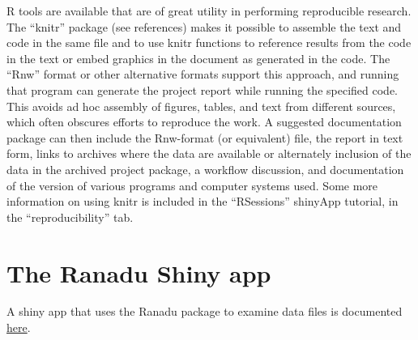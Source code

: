 \documentclass[12pt,english]{report}\usepackage[]{graphicx}\usepackage[]{color}
\begin{document}
R tools are available that are of great utility in performing reproducible
research. The ``knitr'' package (see references) makes it possible
to assemble the text and code in the same file and to use knitr functions
to reference results from the code in the text or embed graphics in
the document as generated in the code. The ``Rnw'' format or other
alternative formats support this approach, and running that program
can generate the project report while running the specified code.
This avoids ad hoc assembly of figures, tables, and text from different
sources, which often obscures efforts to reproduce the work. A suggested
documentation package can then include the Rnw-format (or equivalent)
file, the report in text form, links to archives where the data are
available or alternately inclusion of the data in the archived project
package, a workflow discussion, and documentation of the version of
various programs and computer systems used. Some more information
on using knitr is included in the ``RSessions'' shinyApp tutorial,
in the ``reproducibility'' tab.

\section{The Ranadu Shiny app}

A shiny app that uses the Ranadu package to examine data files is
documented \href{https://drive.google.com/open?id=0B1kIUH45ca5AV1VDS1VxVDJaMmM}{here}.



\end{document}
